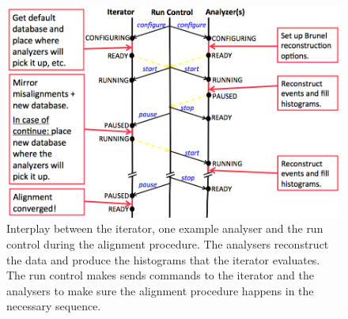 \begin{figure}[htbp]
  \vspace{-0.5\baselineskip}
  \centering
  \includegraphics[width=\textwidth]{figs/Online/runcontrol}
  \vspace{-0.5\baselineskip}
  \caption{Interplay between the iterator, one example analyser and the run control during the \rich alignment procedure. The analysers reconstruct the data and produce the histograms that the iterator evaluates. The run control makes sends commands to the iterator and the analysers to make sure the alignment procedure happens in the necessary sequence. }
  \label{fig:runcontrol}
  \vspace{-0.5\baselineskip}
\end{figure}